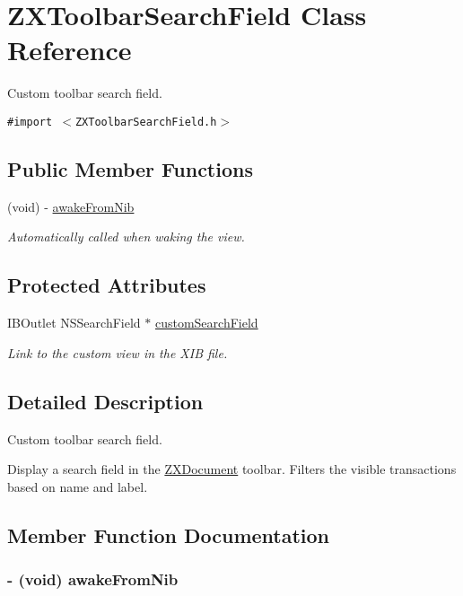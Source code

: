 \hypertarget{interface_z_x_toolbar_search_field}{
\section{ZXToolbarSearchField Class Reference}
\label{interface_z_x_toolbar_search_field}
}
Custom toolbar search field.  


{\tt \#import $<$ZXToolbarSearchField.h$>$}

\subsection*{Public Member Functions}
\begin{CompactItemize}
\item 
(void) - \hyperlink{interface_z_x_toolbar_search_field_5aea36bc75831040296d9d207f9a4a6b}{awakeFromNib}
\begin{CompactList}\small\item\em Automatically called when waking the view. \item\end{CompactList}\end{CompactItemize}
\subsection*{Protected Attributes}
\begin{CompactItemize}
\item 
IBOutlet NSSearchField $\ast$ \hyperlink{interface_z_x_toolbar_search_field_74f14a544b5f8091173aca4926615f0c}{customSearchField}
\begin{CompactList}\small\item\em Link to the custom view in the XIB file. \item\end{CompactList}\end{CompactItemize}


\subsection{Detailed Description}
Custom toolbar search field. 

Display a search field in the \hyperlink{interface_z_x_document}{ZXDocument} toolbar. Filters the visible transactions based on name and label. 

\subsection{Member Function Documentation}
\hypertarget{interface_z_x_toolbar_search_field_5aea36bc75831040296d9d207f9a4a6b}{
\subsubsection[{awakeFromNib}]{\setlength{\rightskip}{0pt plus 5cm}- (void) awakeFromNib }}
\label{interface_z_x_toolbar_search_field_5aea36bc75831040296d9d207f9a4a6b}


